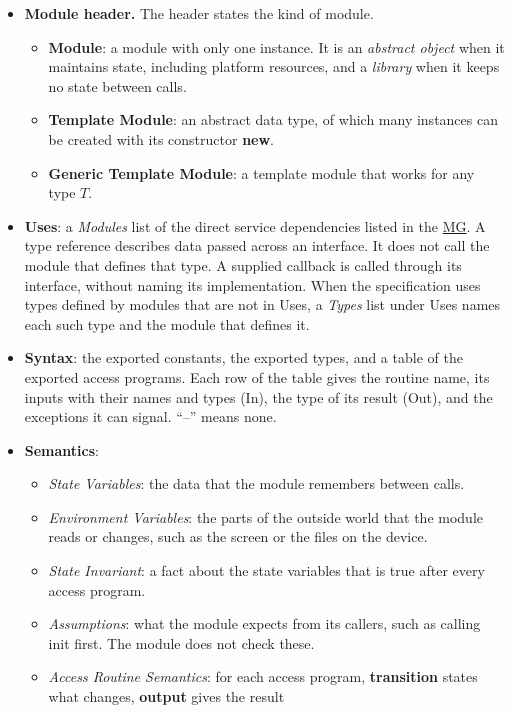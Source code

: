 \documentclass[10pt, titlepage]{article}
\newcommand{\mgurl}{https://github.com/team-hindsight/ophthamology-game/blob/main/pdfs/Design/SoftArchitecture/MG.pdf}
\newcommand{\mg}{\href{\mgurl}{MG}}
\begin{document}
\begin{itemize}
\item \textbf{Module header.} The header states the kind of module.
  \begin{itemize}
  \item \textbf{Module}: a module with only one instance. It is an
    \emph{abstract object} when it maintains state, including platform
    resources, and a \emph{library} when it keeps no state between calls.
  \item \textbf{Template Module}: an abstract data type, of which many
    instances can be created with its constructor \textbf{new}.
  \item \textbf{Generic Template Module}: a template module that works for
    any type $T$.
  \end{itemize}
\item \textbf{Uses}: a \emph{Modules} list of the direct service
  dependencies listed in the \mg{}.
  A type reference describes data passed across an interface. It does not
  call the module that defines that type. A supplied callback is called
  through its interface, without naming its implementation. When the
  specification uses types defined by modules that are not in Uses, a
  \emph{Types} list under Uses names each such type and the module that
  defines it.
\item \textbf{Syntax}: the exported constants, the exported types, and a table
  of the exported access programs. Each row of the table gives the routine
  name, its inputs with their names and types (In), the type of its result
  (Out), and the exceptions it can signal. ``--'' means none.
\item \textbf{Semantics}:
  \begin{itemize}
  \item \emph{State Variables}: the data that the module remembers between
    calls.
  \item \emph{Environment Variables}: the parts of the outside world that the
    module reads or changes, such as the screen or the files on the device.
  \item \emph{State Invariant}: a fact about the state variables that is true
    after every access program.
  \item \emph{Assumptions}: what the module expects from its callers, such as
    calling init first. The module does not check these.
  \item \emph{Access Routine Semantics}: for each access program,
    \textbf{transition} states what changes, \textbf{output} gives the result

\end{itemize}
\end{itemize}
\end{document}
